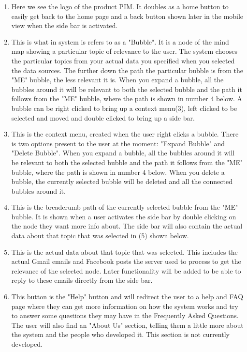 \documentclass[hidelinks,english]{article}
\begin{document}
	\begin{enumerate}  
        \item Here we see the logo of the product PIM. It doubles as a home button to easily get back to the home page and a back button shown later in the mobile view when the side bar is activated.
        \item This is what in system is refers to as a "Bubble". It is a node of the mind map showing a particular topic of relevance to the user. The system chooses the particular topics from your actual data you specified when you selected the data sources. The further down the path the particular bubble is from the "ME" bubble, the less relevant it is. When you expand a bubble, all the bubbles around it will be relevant to both the selected bubble and the path it follows from the "ME" bubble, where the path is shown in number 4 below. A bubble can be right clicked to bring up a context menu(3), left clicked to be selected and moved and double clicked to bring up a side bar.
        \item This is the context menu, created when the user right clicks a bubble. There is two options present to the user at the moment: "Expand Bubble" and "Delete Bubble". When you expand a bubble, all the bubbles around it will be relevant to both the selected bubble and the path it follows from the "ME" bubble, where the path is shown in number 4 below. When you delete a bubble, the currently selected bubble will be deleted and all the connected bubbles around it.
        \item This is the breadcrumb path of the currently selected bubble from the "ME" bubble. It is shown when a user activates the side bar by double clicking on the node they want more info about. The side bar will also contain the actual data about that topic that was selected in (5) shown below.
        \item This is the actual data about that topic that was selected. This includes the actual Gmail emails and Facebook posts the server used to process to get the relevance of the selected node. Later functionality will be added to be able to reply to these emails directly from the side bar.
        \item This button is the "Help" button and will redirect the user to a help and FAQ page where they can get more information on how the system works and try to answer some questions they may have in the Frequently Asked Questions. The user will also find an "About Us" section, telling them a little more about the system and the people who developed it. This section is not currently developed.

\end{enumerate}
\end{document}

